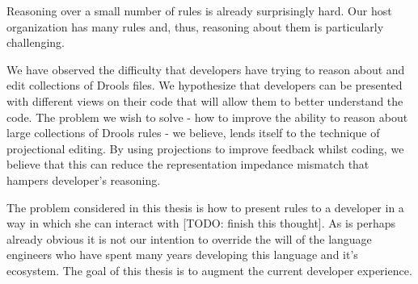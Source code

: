 Reasoning over a small number of rules is already surprisingly hard.
Our host organization has many rules and, thus, reasoning about them is particularly challenging.

We have observed the difficulty that developers have trying to reason about and edit collections of Drools files.
We hypothesize that developers can be presented with different views on their code that will allow them to better understand the code.
The problem we wish to solve - how to improve the ability to reason about large collections of Drools rules - we believe, lends itself to the technique of projectional editing.
By using projections to improve feedback whilst coding, we believe that this can reduce the representation impedance mismatch that hampers developer's reasoning.

The problem considered in this thesis is how to present rules to a developer in a way in which she can interact with [TODO: finish this thought].
As is perhaps already obvious it is not our intention to override the will of the language engineers who have spent many years developing this language and it's ecosystem.
The goal of this thesis is to augment the current developer experience.